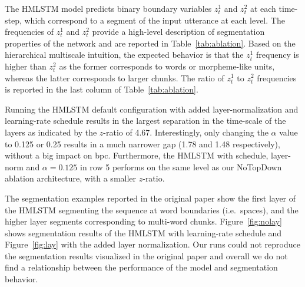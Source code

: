 The HMLSTM model predicts binary boundary variables $z^1_t$ and $z^2_t$ at each time-step, which correspond to a segment of the input utterance at each level. 
The frequencies of $z^1_t$ and $z^2_t$ provide a high-level description of segmentation properties of the network and are reported in Table~\ref{tab:ablation}. Based on the hierarchical multiscale intuition, the expected behavior is that the $z^1_t$ frequency is higher than $z^2_t$ as the former corresponds to words or morpheme-like units, whereas the latter corresponds to larger chunks. The ratio of  $z^1_t$ to $z^2_t$ frequencies is reported in the last column of Table~\ref{tab:ablation}.

Running the HMLSTM default configuration with added layer-normalization and learning-rate schedule results in the largest separation in the time-scale of the layers as indicated by the $z$-ratio of 4.67. Interestingly, only changing the $\alpha$ value to 0.125 or 0.25 results in a much narrower gap (1.78 and 1.48 respectively), without a big impact on bpc. Furthermore, the HMLSTM with schedule, layer-norm and $\alpha=0.125$ in row 5 performs on the same level as our NoTopDown ablation architecture, with a smaller $z$-ratio.

The segmentation examples reported in the original paper show the first layer of the HMLSTM segmenting the sequence at word boundaries (i.e.\ spaces), and the higher layer segments corresponding to multi-word chunks. Figure~\ref{fig:nolay} shows segmentation results of the HMLSTM with learning-rate schedule and Figure~\ref{fig:lay} with the added layer normalization.  Our runs could not reproduce the segmentation results visualized in the original paper and overall we do not find a relationship between the performance of the model and segmentation behavior.


